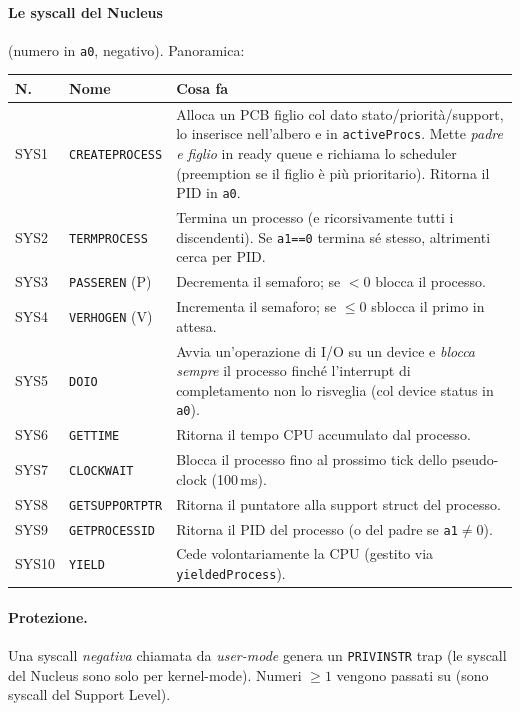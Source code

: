 \documentclass[11pt,a4paper]{article}
\newcommand{\code}[1]{\texttt{#1}}
\begin{document}
\paragraph{Le syscall del Nucleus} (numero in \code{a0}, negativo). Panoramica:
\begin{center}
\begin{longtable}{@{}llp{8.6cm}@{}}
\toprule
\textbf{N.} & \textbf{Nome} & \textbf{Cosa fa} \\
\midrule
SYS1 & \code{CREATEPROCESS} & Alloca un PCB figlio col dato stato/priorità/support, lo inserisce nell'albero e in \code{activeProcs}. Mette \emph{padre e figlio} in ready queue e richiama lo scheduler (preemption se il figlio è più prioritario). Ritorna il PID in \code{a0}. \\
SYS2 & \code{TERMPROCESS} & Termina un processo (e ricorsivamente tutti i discendenti). Se \code{a1==0} termina sé stesso, altrimenti cerca per PID. \\
SYS3 & \code{PASSEREN} (P) & Decrementa il semaforo; se $<0$ blocca il processo. \\
SYS4 & \code{VERHOGEN} (V) & Incrementa il semaforo; se $\le 0$ sblocca il primo in attesa. \\
SYS5 & \code{DOIO} & Avvia un'operazione di I/O su un device e \emph{blocca sempre} il processo finché l'interrupt di completamento non lo risveglia (col device status in \code{a0}). \\
SYS6 & \code{GETTIME} & Ritorna il tempo CPU accumulato dal processo. \\
SYS7 & \code{CLOCKWAIT} & Blocca il processo fino al prossimo tick dello pseudo-clock (100\,ms). \\
SYS8 & \code{GETSUPPORTPTR} & Ritorna il puntatore alla support struct del processo. \\
SYS9 & \code{GETPROCESSID} & Ritorna il PID del processo (o del padre se \code{a1}$\neq$0). \\
SYS10 & \code{YIELD} & Cede volontariamente la CPU (gestito via \code{yieldedProcess}). \\
\bottomrule
\end{longtable}
\end{center}

\paragraph{Protezione.} Una syscall \emph{negativa} chiamata da \emph{user-mode}
genera un \code{PRIVINSTR} trap (le syscall del Nucleus sono solo per kernel-mode).
Numeri $\ge 1$ vengono passati su (sono syscall del Support Level).
\end{document}
